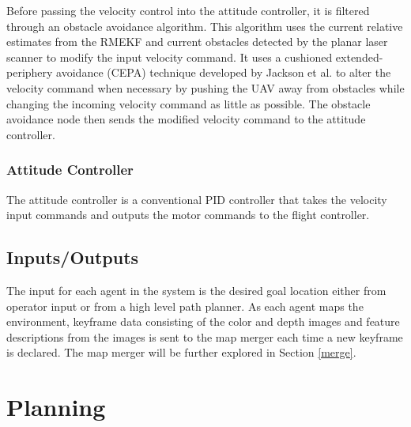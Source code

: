 \documentclass[letterpaper, 10 pt, conference]{ieeeconf}  %
\begin{document}
Before passing the velocity control into the attitude controller, it is filtered through an obstacle avoidance algorithm. This algorithm uses the current relative estimates from the RMEKF and current obstacles detected by the planar laser scanner to modify the input velocity command. It uses a cushioned extended-periphery avoidance (CEPA) technique developed by Jackson et al. \cite{Jackson2016} to alter the velocity command when necessary by pushing the UAV away from obstacles while changing the incoming velocity command as little as possible. The obstacle avoidance node then sends the modified velocity command to the attitude controller.

\subsubsection{Attitude Controller}

The attitude controller is a conventional PID controller that takes the velocity input commands and outputs the motor commands to the flight controller.

\subsection{Inputs/Outputs}

The input for each agent in the system is the desired goal location either from operator input or from a high level path planner. As each agent maps the environment, keyframe data consisting of the color and depth images and feature descriptions from the images is sent to the map merger each time a new keyframe is declared. The map merger will be further explored in Section \ref{merge}.

\section{Planning}\label{planning}
\end{document}
